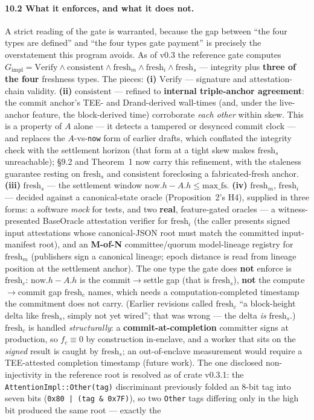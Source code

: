 \documentclass[11pt]{article}
\begin{document}
\paragraph{10.2 What it enforces, and what it does not.} A strict reading of the gate is warranted, because the gap between ``the four types are defined'' and ``the four types gate payment'' is precisely the overstatement this program avoids. As of v0.3 the reference gate computes $G_{\mathrm{impl}} = \mathrm{Verify} \wedge \mathrm{consistent} \wedge \mathrm{fresh}_m \wedge \mathrm{fresh}_i \wedge \mathrm{fresh}_s$ --- integrity plus \textbf{three of the four} freshness types. The pieces: \textbf{(i)} $\mathrm{Verify}$ --- signature and attestation-chain validity. \textbf{(ii)} $\mathrm{consistent}$ --- refined to \textbf{internal triple-anchor agreement}: the commit anchor's TEE- and Drand-derived wall-times (and, under the live-anchor feature, the block-derived time) corroborate \emph{each other} within skew. This is a property of $A$ alone --- it detects a tampered or desynced commit clock --- and replaces the $A$-vs-\texttt{now} form of earlier drafts, which conflated the integrity check with the settlement horizon (that form at a tight skew makes $\mathrm{fresh}_s$ unreachable); \S9.2 and Theorem~1 now carry this refinement, with the staleness guarantee resting on $\mathrm{fresh}_s$ and $\mathrm{consistent}$ foreclosing a fabricated-fresh anchor. \textbf{(iii)} $\mathrm{fresh}_s$ --- the settlement window $\mathrm{now}.h - A.h \le \mathrm{max\_fs}$. \textbf{(iv)} $\mathrm{fresh}_m$, $\mathrm{fresh}_i$ --- decided against a canonical-state oracle (Proposition~2's H4), supplied in three forms: a software \emph{mock} for tests, and two \textbf{real}, feature-gated oracles --- a witness-presented BaseOracle attestation verifier for $\mathrm{fresh}_i$ (the caller presents signed input attestations whose canonical-JSON root must match the committed input-manifest root), and an \textbf{M-of-N} committee/quorum model-lineage registry for $\mathrm{fresh}_m$ (publishers sign a canonical lineage; epoch distance is read from lineage position at the settlement anchor). The one type the gate does \textbf{not} enforce is $\mathrm{fresh}_c$: $\mathrm{now}.h - A.h$ is the commit$\to$settle gap (that is $\mathrm{fresh}_s$), \textbf{not} the compute$\to$commit gap $\mathrm{fresh}_c$ names, which needs a computation-completed timestamp the commitment does not carry. (Earlier revisions called $\mathrm{fresh}_c$ ``a block-height delta like $\mathrm{fresh}_s$, simply not yet wired''; that was wrong --- the delta \emph{is} $\mathrm{fresh}_s$.) $\mathrm{fresh}_c$ is handled \emph{structurally}: a \textbf{commit-at-completion} committer signs at production, so $f_c \equiv 0$ by construction in-enclave, and a worker that sits on the \emph{signed} result is caught by $\mathrm{fresh}_s$; an out-of-enclave measurement would require a TEE-attested completion timestamp (future work). The one disclosed non-injectivity in the reference root is resolved as of crate v0.3.1: the \texttt{AttentionImpl::Other(tag)} discriminant previously folded an 8-bit tag into seven bits (\texttt{0x80 | (tag \& 0x7F)}), so two \texttt{Other} tags differing only in the high bit produced the same root --- exactly the 
\end{document}
